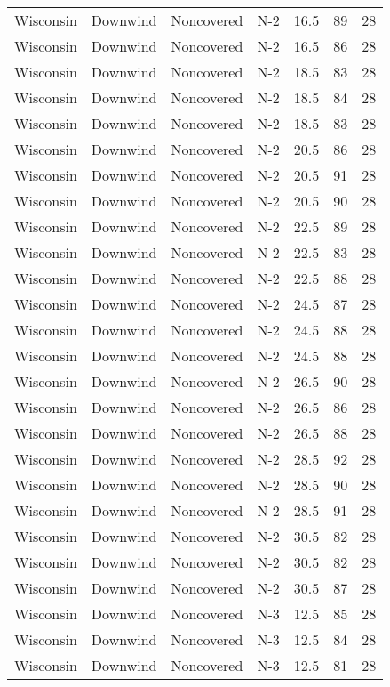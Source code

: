 \documentclass{article}
\begin{document}
\begin{longtable}[H]{ccccccc}
Wisconsin & Downwind & Noncovered & N-2 & 16.5 & 89  & 28 \\
Wisconsin & Downwind & Noncovered & N-2 & 16.5 & 86  & 28 \\
Wisconsin & Downwind & Noncovered & N-2 & 18.5 & 83  & 28 \\
Wisconsin & Downwind & Noncovered & N-2 & 18.5 & 84  & 28 \\
Wisconsin & Downwind & Noncovered & N-2 & 18.5 & 83  & 28 \\
Wisconsin & Downwind & Noncovered & N-2 & 20.5 & 86  & 28 \\
Wisconsin & Downwind & Noncovered & N-2 & 20.5 & 91  & 28 \\
Wisconsin & Downwind & Noncovered & N-2 & 20.5 & 90  & 28 \\
Wisconsin & Downwind & Noncovered & N-2 & 22.5 & 89  & 28 \\
Wisconsin & Downwind & Noncovered & N-2 & 22.5 & 83  & 28 \\
Wisconsin & Downwind & Noncovered & N-2 & 22.5 & 88  & 28 \\
Wisconsin & Downwind & Noncovered & N-2 & 24.5 & 87  & 28 \\
Wisconsin & Downwind & Noncovered & N-2 & 24.5 & 88  & 28 \\
Wisconsin & Downwind & Noncovered & N-2 & 24.5 & 88  & 28 \\
Wisconsin & Downwind & Noncovered & N-2 & 26.5 & 90  & 28 \\
Wisconsin & Downwind & Noncovered & N-2 & 26.5 & 86  & 28 \\
Wisconsin & Downwind & Noncovered & N-2 & 26.5 & 88  & 28 \\
Wisconsin & Downwind & Noncovered & N-2 & 28.5 & 92  & 28 \\
Wisconsin & Downwind & Noncovered & N-2 & 28.5 & 90  & 28 \\
Wisconsin & Downwind & Noncovered & N-2 & 28.5 & 91  & 28 \\
Wisconsin & Downwind & Noncovered & N-2 & 30.5 & 82  & 28 \\
Wisconsin & Downwind & Noncovered & N-2 & 30.5 & 82  & 28 \\
Wisconsin & Downwind & Noncovered & N-2 & 30.5 & 87  & 28 \\
Wisconsin & Downwind & Noncovered & N-3 & 12.5 & 85  & 28 \\
Wisconsin & Downwind & Noncovered & N-3 & 12.5 & 84  & 28 \\
Wisconsin & Downwind & Noncovered & N-3 & 12.5 & 81  & 28 \\

\end{longtable}
\end{document}
